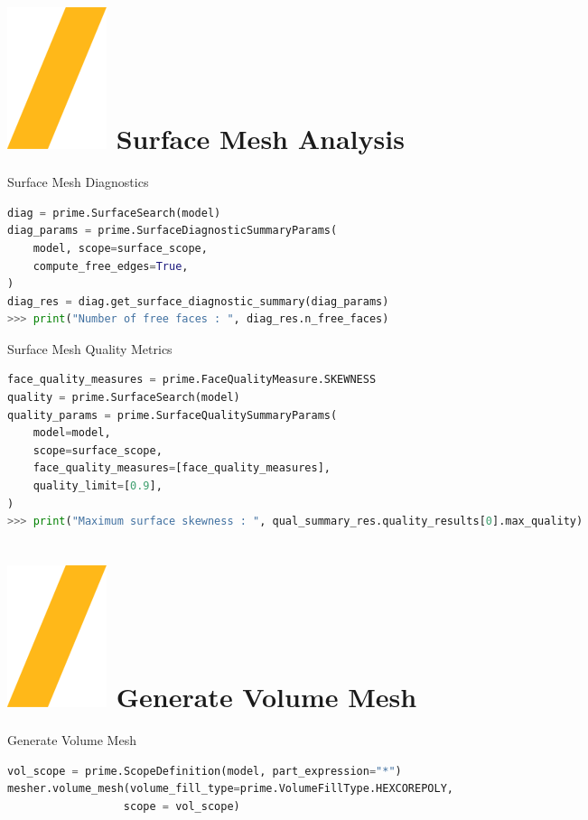 \documentclass[9pt,landscape]{article}
\begin{document}
\begin{multicols}{3}
\section{\includegraphics[height=\fontcharht\font`\S]{slash.png} Surface Mesh Analysis}
Surface Mesh Diagnostics 
\begin{lstlisting}[language=Python]
diag = prime.SurfaceSearch(model)
diag_params = prime.SurfaceDiagnosticSummaryParams(
    model, scope=surface_scope,
    compute_free_edges=True,
) 
diag_res = diag.get_surface_diagnostic_summary(diag_params)
>>> print("Number of free faces : ", diag_res.n_free_faces)
\end{lstlisting}

Surface Mesh Quality Metrics
\begin{lstlisting}[language=Python]
face_quality_measures = prime.FaceQualityMeasure.SKEWNESS
quality = prime.SurfaceSearch(model)
quality_params = prime.SurfaceQualitySummaryParams(
    model=model,
    scope=surface_scope,
    face_quality_measures=[face_quality_measures],
    quality_limit=[0.9],
)
>>> print("Maximum surface skewness : ", qual_summary_res.quality_results[0].max_quality)
\end{lstlisting}

\section{\includegraphics[height=\fontcharht\font`\S]{slash.png} Generate Volume Mesh}
Generate Volume Mesh
\begin{lstlisting}[language=Python]
vol_scope = prime.ScopeDefinition(model, part_expression="*")
mesher.volume_mesh(volume_fill_type=prime.VolumeFillType.HEXCOREPOLY,
                  scope = vol_scope)
\end{lstlisting}

\end{multicols}
\end{document}
